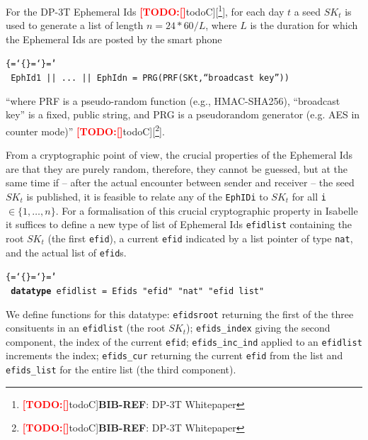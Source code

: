 \documentclass{llncs}
\newenvironment{ttbox}{\begin{alltt}\ttbraces\small\tt}%
                      {\end{alltt}}
\def\ttbraces{\let\.=\nobreak\chardef\{=`\{\chardef\}=`\}\chardef\|=`\\}
\newcommand{\TODO}[1]{\textcolor{red}{\textbf{[TODO:#1]}}}
\newcommand*{\TODOfn}[2][noteC]{\TODO[#1]{[\footnote{\TODO[#1]{#2}}]}}
\newcommand*{\TODOref}[2][todoC]{\TODOfn[#1]{\textbf{BIB-REF}: #2}}
\begin{document}
For the DP-3T Ephemeral Ids \TODOref{DP-3T Whitepaper}, for each day $t$ a seed $SK_t$
is used to generate a list of length $n = 24 * 60 / L$, where $L$ is the duration for which
the Ephemeral Ids are posted by the smart phone
\begin{ttbox}
  EphId1 || ... || EphIdn = PRG(PRF(SKt,``broadcast key''))
\end{ttbox} 
``where PRF is a pseudo-random function (e.g., HMAC-SHA256), ``broadcast key'' is a
fixed, public string, and PRG is a pseudorandom generator (e.g. AES in counter mode)'' \TODOref{DP-3T Whitepaper}.

From a cryptographic point of view, the crucial properties of the Ephemeral Ids are that
they are purely random, therefore, they cannot be guessed, but at the same time if -- after
the actual encounter between sender and receiver -- the seed $SK_t$ is published, it is feasible
to relate any of the \texttt{EphIDi} to $SK_t$  for all \texttt{i} $\in \{1, \ldots, n\}$.
For a formalisation of this crucial cryptographic property in Isabelle it suffices to define a new type
of list of Ephemeral Ids \texttt{efidlist} containing the root $SK_t$ (the first \texttt{efid}),
a current \texttt{efid} indicated by a list pointer of type \texttt{nat}, and the actual list of
\texttt{efid}s.
\begin{ttbox}
{\bf{datatype}} efidlist = Efids "efid" "nat" "efid list"
\end{ttbox}
We define functions for this datatype: \texttt{efidsroot} returning the first of the three
consituents in an \texttt{efidlist} (the root $SK_t$); \texttt{efids\_index} giving the second
component, the index of the current \texttt{efid}; \texttt{efids\_inc\_ind} applied to an
\texttt{efidlist} increments the index; \texttt{efids\_cur} returning the current \texttt{efid}
from the list and \texttt{efids\_list} for the entire list (the third component).
\end{document}
